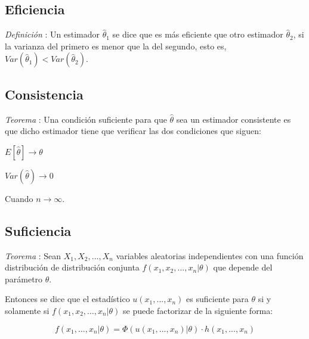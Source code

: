\documentclass[a4paper, 10pt]{article} %
\newcounter{def}
\newcounter{teo}
\begin{document}
\subsection{Eficiencia}
\addtocounter{def}{1}
\emph{Definición }: Un estimador $\hat{\theta}_1$ se dice que es más eficiente que otro estimador
$\hat{\theta}_2$, si la varianza del primero es menor que la del segundo, esto es,  $Var(\hat{\theta}_1)<Var(\hat{\theta}_2)$.

\subsection{Consistencia}
\addtocounter{teo}{1}
\emph{Teorema }: Una condición suficiente para que $\hat{\theta}$ sea un estimador consistente es que
dicho estimador tiene que verificar las dos condiciones que siguen:

\begin{description}
	\item $E[\hat{\theta}] \rightarrow \theta$
	\item $Var(\hat{\theta}) \rightarrow 0$
\end{description}

Cuando $n \rightarrow \infty$.

\subsection{Suficiencia}
\emph{Teorema }: Sean $X_1, X_2, ..., X_n$ variables aleatorias independientes con una función
distribución de distribución conjunta $f(x_1, x_2, ..., x_n | \theta)$ que depende del parámetro $\theta$.

Entonces se dice que el estadístico $u(x_1, ..., x_n)$ es suficiente para $\theta$ si y solamente si
$f(x_1, x_2,\dots, x_n | \theta)$ se puede factorizar de la siguiente forma:

$$ f(x_1,...,x_n| \theta) = \Phi(u(x_1, ..., x_n) | \theta)\cdot h(x_1, ..., x_n) $$
\end{document}
